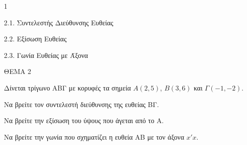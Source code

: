 \begin{ylh}{1}
    \item 2.1. Συντελεστής Διεύθυνσης Ευθείας
    \item 2.2. Εξίσωση Ευθείας
    \item 2.3. Γωνία Ευθείας με Άξονα
\end{ylh}
ΘΕΜΑ 2

Δίνεται τρίγωνο ΑΒΓ με κορυφές τα σημεία $A(2,5)$, $B(3,6)$ και $\Gamma(-1,-2)$.
\begin{alist}
\item Να βρείτε τον συντελεστή διεύθυνσης της ευθείας ΒΓ. 
\item Να βρείτε την εξίσωση του ύψους που άγεται από το Α. 
\item Να βρείτε την γωνία που σχηματίζει η ευθεία ΑΒ με τον άξονα $x'x$. 
\end{alist}